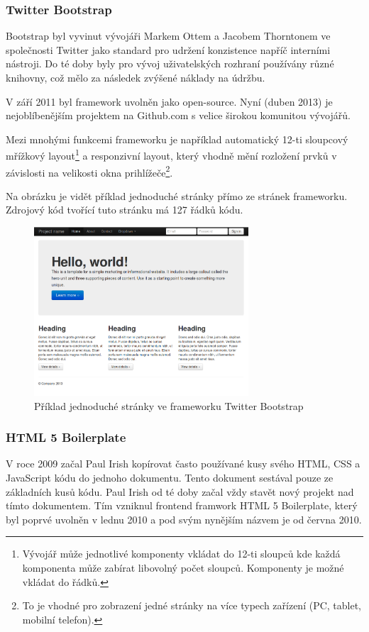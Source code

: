 \subsubsection{Twitter Bootstrap}
Bootstrap byl vyvinut vývojáři Markem Ottem a Jacobem Thorntonem ve společnosti Twitter jako standard pro udržení konzistence napříč interními nástroji. Do té doby byly pro vývoj uživatelských rozhraní používány různé knihovny, což mělo za následek zvýšené náklady na údržbu.

V září 2011 byl framework uvolněn jako open-source. Nyní (duben 2013) je nejoblíbenějším projektem na Github.com s velice širokou komunitou vývojářů\cite{website:github-popular}.


Mezi mnohými funkcemi frameworku je například automatický 12-ti sloupcový mřížkový layout\footnote{Vývojář může jednotlivé komponenty vkládat do 12-ti sloupců kde každá komponenta může zabírat libovolný počet sloupců. Komponenty je možné vkládat do řádků.} a responzivní layout, který vhodně mění rozložení prvků v závislosti na velikosti okna prihlížeče\footnote{To je vhodné pro zobrazení jedné stránky na více typech zařízení (PC, tablet, mobilní telefon).}.

Na obrázku je vidět příklad jednoduché stránky přímo ze stránek frameworku. Zdrojový kód tvořící tuto stránku má 127 řádků kódu\cite{website:bootstrap-example}.

\begin{figure}[htb]
\begin{center}
\includegraphics[width=80mm]{./pictures/bootstrap-example.png}
\caption{Příklad jednoduché stránky ve frameworku Twitter Bootstrap \cite{website:bootstrap-example}}
\label{fig:bootstrap-example}
\end{center}
\end{figure}

\subsubsection{HTML 5 Boilerplate}
V roce 2009 začal Paul Irish kopírovat často používané kusy svého HTML, CSS a JavaScript kódu do jednoho dokumentu. Tento dokument sestával pouze ze základních kusů kódu. Paul Irish od té doby začal vždy stavět nový projekt nad tímto dokumentem. Tím vzniknul frontend framwork HTML 5 Boilerplate, který byl poprvé uvolněn v lednu 2010 a pod svým nynějším názvem je od června 2010.\cite{website:boilerplate-history}

